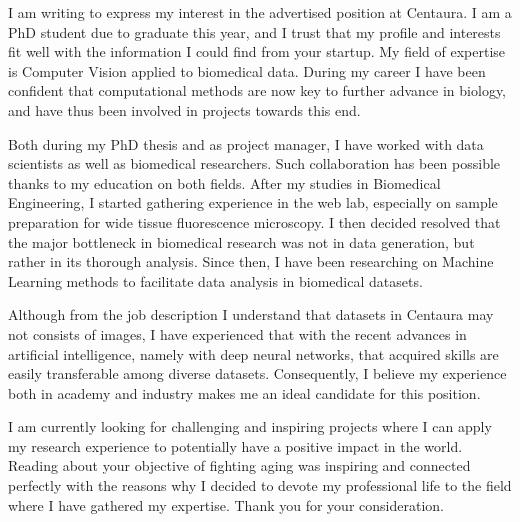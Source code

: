 \documentclass[11pt, a4paper]{ag-cv} %
\begin{document}
\makecvheader %

\makelettertitle %


\begin{cvletter}








I am writing to express my interest in the advertised position at Centaura. I am a PhD student due to graduate this year, and I trust that my profile and interests fit well with the information I could find from your startup. 
My field of expertise is Computer Vision applied to biomedical data. During my career I have been confident that computational methods are now key to further advance in biology, and have thus been involved in projects towards this end. 

Both during my PhD thesis and as project manager, I have worked with data scientists as well as biomedical researchers. Such collaboration has been possible thanks to my education on both fields. After my studies in Biomedical Engineering, I started gathering experience in the web lab, especially on sample preparation for wide tissue fluorescence microscopy. I then decided resolved that the major bottleneck in biomedical research was not in data generation, but rather in its thorough analysis. Since then, I have been researching on Machine Learning methods to facilitate data analysis in biomedical datasets.

Although from the job description I understand that datasets in Centaura may not consists of images, I have experienced that with the recent advances in artificial intelligence, namely with deep neural networks, that acquired skills are easily transferable among diverse datasets. Consequently, I believe my experience both in academy and industry makes me an ideal candidate for this position. 

I am currently looking for challenging and inspiring projects where I can apply my research experience to potentially have a positive impact in the world. Reading about your objective of fighting aging was inspiring and connected perfectly with the reasons why I decided to devote my professional life to the field where I have gathered my expertise. Thank you for your consideration.



\end{cvletter}


\makeletterclosing %
\end{document}
